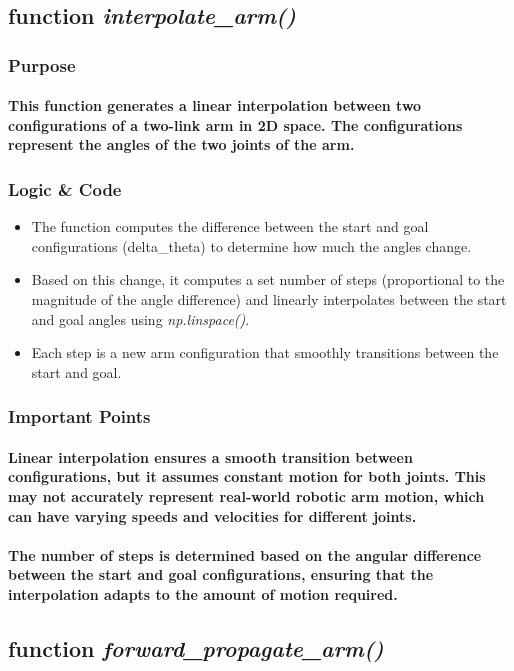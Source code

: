 \documentclass[12pt, letterpaper]{article}
\begin{document}
\subsection{function \textit{interpolate\_arm()}}
\subsubsection{Purpose}
\paragraph{This function generates a linear interpolation between two configurations of a two-link arm in 2D space. The configurations represent the angles of the two joints of the arm.}
\subsubsection{Logic \& Code}
\begin{itemize}
    \item{The function computes the difference between the start and goal configurations (delta\_theta) to determine how much the angles change.}
    \item{Based on this change, it computes a set number of steps (proportional to the magnitude of the angle difference) and linearly interpolates between the start and goal angles using \textit{np.linspace()}.}
    \item{Each step is a new arm configuration that smoothly transitions between the start and goal.}
\end{itemize}
\subsubsection{Important Points}
\paragraph{Linear interpolation ensures a smooth transition between configurations, but it assumes constant motion for both joints. This may not accurately represent real-world robotic arm motion, which can have varying speeds and velocities for different joints.}
\paragraph{The number of steps is determined based on the angular difference between the start and goal configurations, ensuring that the interpolation adapts to the amount of motion required.}
\subsection{function \textit{forward\_propagate\_arm()}}
\end{document}
